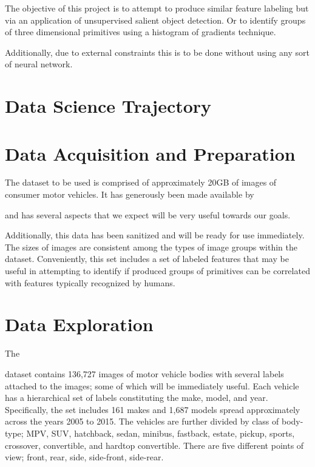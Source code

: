 \documentclass[sigplan,nonacm]{acmart}
\begin{document}
The objective of this project is to attempt to produce similar feature labeling but
via an application of unsupervised salient object detection.
Or to identify groups of three dimensional primitives using a histogram of gradients technique.

Additionally, due to external constraints this is to be done without using any sort of neural network.


\section{Data Science Trajectory}




\section{Data Acquisition and Preparation}

The dataset to be used is comprised of approximately 20GB of images of consumer motor vehicles.
It has generously been made available by

\cite{}

and has several aspects that we expect will be very useful towards our goals.

Additionally, this data has been sanitized and will be ready for use immediately.
The sizes of images are consistent among the types of image groups within the dataset.
Conveniently, this set includes a set of labeled features that may be useful in 
attempting to identify if produced groups of primitives can be correlated with
features typically recognized by humans.

\section{Data Exploration}

The

\cite{}

dataset contains 136,727 images of motor vehicle bodies with several labels attached to the images; 
some of which will be immediately useful.
Each vehicle has a hierarchical set of labels constituting the make, model, and year.
Specifically, the set includes 161 makes and 1,687 models spread approximately across
the years 2005 to 2015.
The vehicles are further divided by class of body-type; MPV, SUV, hatchback, sedan, minibus, fastback, estate, pickup, sports, crossover, convertible, and hardtop convertible.
There are five different points of view; front, rear, side, side-front, side-rear.
\end{document}
